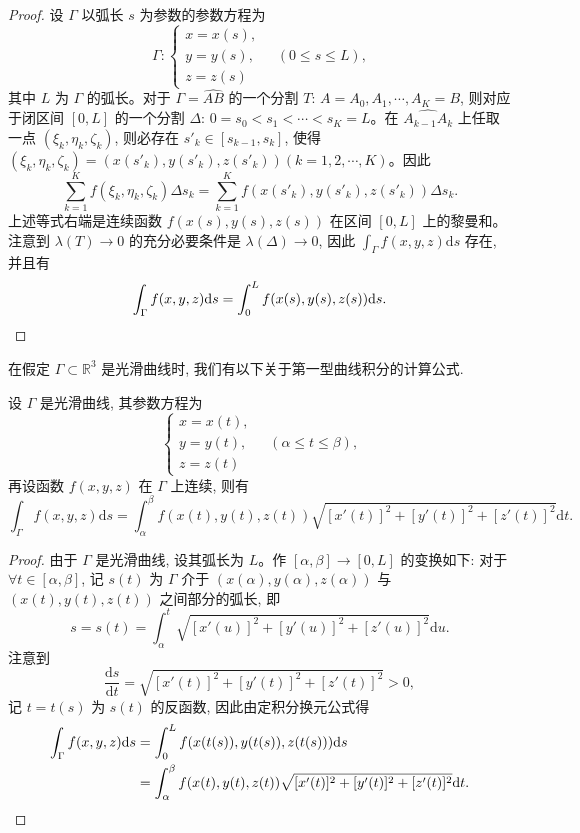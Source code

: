 \begin{proof}
设 $\Gamma$ 以弧长 $s$ 为参数的参数方程为
\[
  \Gamma:
  \begin{cases}
    x=x(s),\\
    y=y(s),\\
    z=z(s)
  \end{cases}
  \quad(0\leqslant s\leqslant L),
\]
其中 $L$ 为 $\Gamma$ 的弧长。对于 $\Gamma=\widehat{AB}$ 的一个分割 $T$: $A=A_0,A_1,\cdots,A_K=B$, 则对应于闭区间 $[0,L]$ 的一个分割 $\Delta$: $0=s_0<s_1<\cdots<s_K=L$。在 $\widehat{A_{k-1}A_k}$ 上任取一点 $(\xi_k,\eta_k,\zeta_k)$, 则必存在 $s'_k\in[s_{k-1},s_k]$, 使得 $(\xi_k,\eta_k,\zeta_k)=(x(s'_k),y(s'_k),z(s'_k))(k=1,2,\cdots,K)$。因此
\[
  \sum_{k=1}^K f(\xi_k,\eta_k,\zeta_k)\Delta s_k
  =\sum_{k=1}^K f(x(s'_k),y(s'_k),z(s'_k))\Delta s_k.
\]
上述等式右端是连续函数 $f(x(s),y(s),z(s))$ 在区间 $[0,L]$ 上的黎曼和。注意到 $\lambda(T)\to0$ 的充分必要条件是 $\lambda(\Delta)\to0$, 因此 $\int_\Gamma f(x,y,z)\mathrm ds$ 存在, 并且有
\[
  \int_\Gamma f(x,y,z)\mathrm ds=\int_0^L f(x(s),y(s),z(s))\mathrm ds.
\qedhere
\]
\end{proof}


在假定 $\Gamma\subset\mathbb R^3$ 是光滑曲线时, 我们有以下关于第一型曲线积分的计算公式.

\begin{theorem}\label{theorem:ma-16-1-2}
设 $\Gamma$ 是光滑曲线, 其参数方程为
\[
  \begin{cases}
    x=x(t),\\
    y=y(t),\\
    z=z(t)
  \end{cases}
  \quad(\alpha\leqslant t\leqslant \beta),
\]
再设函数 $f(x,y,z)$ 在 $\Gamma$ 上连续, 则有
\[
  \int_\Gamma f(x,y,z)\mathrm ds
  =\int_\alpha^\beta f(x(t),y(t),z(t))
  \sqrt{[x'(t)]^2+[y'(t)]^2+[z'(t)]^2}\mathrm dt.
\]
\end{theorem}


\begin{proof}
由于 $\Gamma$ 是光滑曲线, 设其弧长为 $L$。作 $[\alpha,\beta]\to[0,L]$ 的变换如下: 对于 $\forall t\in[\alpha,\beta]$, 记 $s(t)$ 为 $\Gamma$ 介于 $(x(\alpha),y(\alpha),z(\alpha))$ 与 $(x(t),y(t),z(t))$ 之间部分的弧长, 即
\[
  s=s(t)=\int_\alpha^t \sqrt{[x'(u)]^2+[y'(u)]^2+[z'(u)]^2}\mathrm du.
\]
注意到
\[
  \frac{\mathrm ds}{\mathrm dt}
  =\sqrt{[x'(t)]^2+[y'(t)]^2+[z'(t)]^2}>0,
\]
记 $t=t(s)$ 为 $s(t)$ 的反函数, 因此由定积分换元公式得
\[
\begin{aligned}
  \int_\Gamma f(x,y,z)\mathrm ds
  &=\int_0^L f(x(t(s)),y(t(s)),z(t(s)))\mathrm ds\\
  &=\int_\alpha^\beta f(x(t),y(t),z(t))
    \sqrt{[x'(t)]^2+[y'(t)]^2+[z'(t)]^2}\mathrm dt.
\end{aligned}
\qedhere
\]
\end{proof}


